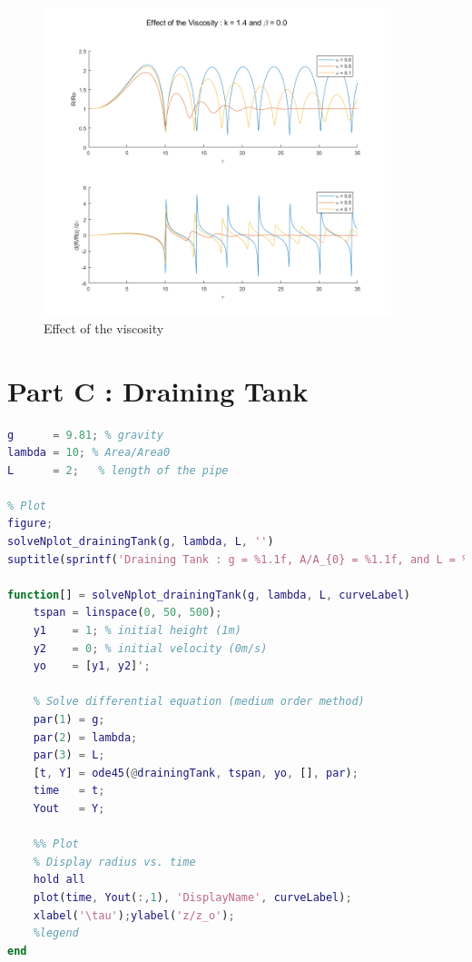 \documentclass{article}
\begin{document}
\begin{figure}[h!]
	\centering
	\includegraphics[width=0.90\textwidth]{./matlab/growingBubbles_Viscosity.png}
	\caption{Effect of the viscosity}
	\label{img:growingBubblesViscosity}
\end{figure}


\section{Part C : Draining Tank}

\begin{lstlisting}[language=Matlab, caption=Draining Tank : Solve and Plot, label=lis:drainingTankSolveAndPlot]
% Runge-Kutta
g      = 9.81; % gravity
lambda = 10; % Area/Area0
L      = 2;   % length of the pipe

% Plot
figure;
solveNplot_drainingTank(g, lambda, L, '')
suptitle(sprintf('Draining Tank : g = %1.1f, A/A_{0} = %1.1f, and L = %1.1f', g, lambda, L))

function[] = solveNplot_drainingTank(g, lambda, L, curveLabel)
    tspan = linspace(0, 50, 500);
    y1    = 1; % initial height (1m)
    y2    = 0; % initial velocity (0m/s)
    yo    = [y1, y2]';

    % Solve differential equation (medium order method)
    par(1) = g;
    par(2) = lambda;
    par(3) = L;
    [t, Y] = ode45(@drainingTank, tspan, yo, [], par);
    time   = t;
    Yout   = Y;

    %% Plot
    % Display radius vs. time
    hold all
    plot(time, Yout(:,1), 'DisplayName', curveLabel);
    xlabel('\tau');ylabel('z/z_o');
    %legend
end
\end{lstlisting}
\end{document}
